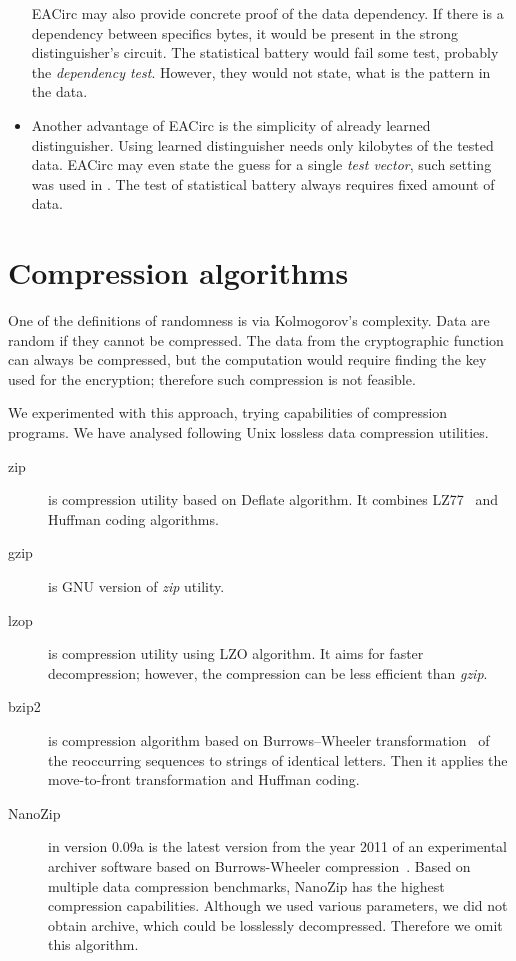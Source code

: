 \documentclass[
    digital,    %
    oneside,    %
    color,
    11pt,
    nocover,
    notable,
    nolof,
    nolot,
]{fithesis3}
\begin{document}
\begin{itemize}
    EACirc may also provide concrete proof of the data dependency. If there is a dependency between specifics bytes, it would be present in the strong distinguisher's circuit. The statistical battery would fail some test, probably the \textit{dependency test}. However, they would not state, what is the pattern in the data.
    \item Another advantage of EACirc is the simplicity of already learned distinguisher. Using learned distinguisher needs only kilobytes of the tested data. EACirc may even state the guess for a single \textit{test vector}, such setting was used in \cite{ukropBcThesis}. The test of statistical battery always requires fixed amount of data.
\end{itemize}

\section{Compression algorithms}
\label{sec:relatwork-compress}

One of the definitions of randomness is via Kolmogorov's complexity. Data are random if they cannot be compressed. The data from the cryptographic function can always be compressed, but the computation would require finding the key used for the encryption; therefore such compression is not feasible.

We experimented with this approach, trying capabilities of compression programs. We have analysed following Unix lossless data compression utilities.

\begin{description}
    \item[zip] is compression utility based on Deflate algorithm. It combines LZ77~\cite{ziv1977universal} and Huffman coding algorithms.
    \item[gzip] is GNU version of \textit{zip} utility.
    \item[lzop] is compression utility using LZO algorithm. It aims for faster decompression; however, the compression can be less efficient than \textit{gzip}.
    \item[bzip2] is compression algorithm based on Burrows–Wheeler transformation~\cite{burrows1994block} of the reoccurring sequences to strings of identical letters. Then it applies the move-to-front transformation and Huffman coding. 
    \item[NanoZip] in version 0.09a is the latest version from the year 2011 of an experimental archiver software based on Burrows-Wheeler compression~\cite{nanozip}. Based on multiple data compression benchmarks, NanoZip has the highest compression capabilities. Although we used various parameters, we did not obtain archive, which could be losslessly decompressed. Therefore we omit this algorithm.
\end{description}
\end{document}
